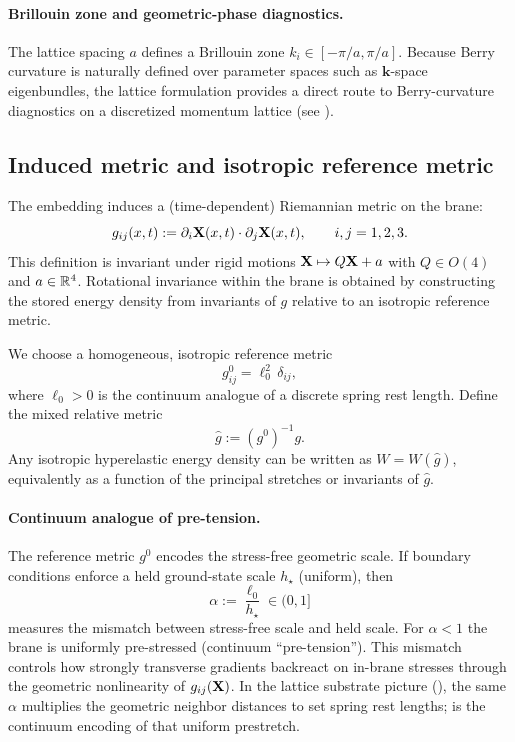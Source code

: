 \paragraph{Brillouin zone and geometric-phase diagnostics.}
The lattice spacing $a$ defines a Brillouin zone $k_i\in[-\pi/a,\pi/a]$.
Because Berry curvature is naturally defined over parameter spaces such as $\mathbf{k}$-space eigenbundles,
the lattice formulation provides a direct route to Berry-curvature diagnostics on a discretized momentum lattice
(see ).

\subsection{Induced metric and isotropic reference metric}

The embedding induces a (time-dependent) Riemannian metric on the brane:
\begin{equation}
  g_{ij}(x,t) := \partial_i \mathbf{X}(x,t)\cdot \partial_j \mathbf{X}(x,t),
  \qquad i,j=1,2,3.
  \label{eq:induced-metric}
\end{equation}
This definition is invariant under rigid motions $\mathbf{X}\mapsto Q\mathbf{X}+a$ with $Q\in O(4)$ and $a\in\mathbb{R}^4$.
Rotational invariance within the brane is obtained by constructing the stored energy density from invariants of $g$
relative to an isotropic reference metric.

We choose a homogeneous, isotropic reference metric
\begin{equation}
  g^0_{ij}=\ell_0^2\,\delta_{ij},
  \label{eq:reference-metric}
\end{equation}
where $\ell_0>0$ is the continuum analogue of a discrete spring rest length.
Define the mixed relative metric
\begin{equation}
  \widehat g := (g^0)^{-1}g.
  \label{eq:relative-metric}
\end{equation}
Any isotropic hyperelastic energy density can be written as $W=W(\widehat g)$, equivalently as a function of the
principal stretches or invariants of $\widehat g$.

\paragraph{Continuum analogue of pre-tension.}
The reference metric $g^0$ encodes the stress-free geometric scale.
If boundary conditions enforce a held ground-state scale $h_\star$ (uniform), then
\begin{equation}
  \alpha:=\frac{\ell_0}{h_\star}\in(0,1]
  \label{eq:alpha-def}
\end{equation}
measures the mismatch between stress-free scale and held scale.
For $\alpha<1$ the brane is uniformly pre-stressed (continuum ``pre-tension''). This mismatch controls how strongly
transverse gradients backreact on in-brane stresses through the geometric nonlinearity of $g_{ij}(\mathbf{X})$.
In the lattice substrate picture (), the same $\alpha$ multiplies the geometric
neighbor distances to set spring rest lengths;  is the continuum encoding of that uniform prestretch.

